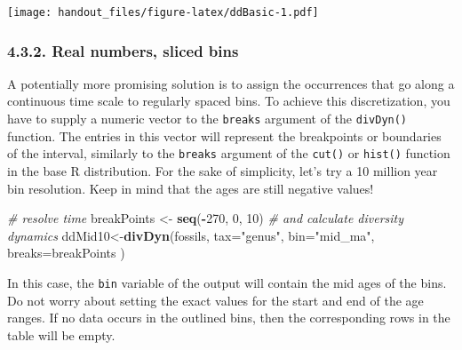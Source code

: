 \documentclass[]{article}
\newenvironment{Shaded}{\begin{snugshade}}{\end{snugshade}}
\newcommand{\CommentTok}[1]{\textcolor[rgb]{0.56,0.35,0.01}{\textit{#1}}}
\newcommand{\DataTypeTok}[1]{\textcolor[rgb]{0.13,0.29,0.53}{#1}}
\newcommand{\DecValTok}[1]{\textcolor[rgb]{0.00,0.00,0.81}{#1}}
\newcommand{\KeywordTok}[1]{\textcolor[rgb]{0.13,0.29,0.53}{\textbf{#1}}}
\newcommand{\NormalTok}[1]{#1}
\newcommand{\OperatorTok}[1]{\textcolor[rgb]{0.81,0.36,0.00}{\textbf{#1}}}
\newcommand{\StringTok}[1]{\textcolor[rgb]{0.31,0.60,0.02}{#1}}
\begin{document}
\texttt{[image: handout\_files/figure-latex/ddBasic-1.pdf]}

\hypertarget{real-numbers-sliced-bins}{%
\subsubsection{4.3.2. Real numbers, sliced
bins}\label{real-numbers-sliced-bins}}

A potentially more promising solution is to assign the occurrences that
go along a continuous time scale to regularly spaced bins. To achieve
this discretization, you have to supply a numeric vector to the
\texttt{breaks} argument of the \texttt{divDyn()} function. The entries
in this vector will represent the breakpoints or boundaries of the
interval, similarly to the \texttt{breaks} argument of the
\texttt{cut()} or \texttt{hist()} function in the base R distribution.
For the sake of simplicity, let's try a 10 million year bin resolution.
Keep in mind that the ages are still negative values!

\begin{Shaded}
\begin{Highlighting}[]
\CommentTok{# resolve time}
\NormalTok{  breakPoints <-}\StringTok{ }\KeywordTok{seq}\NormalTok{(}\OperatorTok{-}\DecValTok{270}\NormalTok{, }\DecValTok{0}\NormalTok{, }\DecValTok{10}\NormalTok{)}
\CommentTok{# and calculate diversity dynamics}
\NormalTok{  ddMid10<-}\KeywordTok{divDyn}\NormalTok{(fossils, }\DataTypeTok{tax=}\StringTok{"genus"}\NormalTok{, }\DataTypeTok{bin=}\StringTok{"mid_ma"}\NormalTok{, }\DataTypeTok{breaks=}\NormalTok{breakPoints )}
\end{Highlighting}
\end{Shaded}

In this case, the \texttt{bin} variable of the output will contain the
mid ages of the bins. Do not worry about setting the exact values for
the start and end of the age ranges. If no data occurs in the outlined
bins, then the corresponding rows in the table will be empty.

\begin{Shaded}
\end{Shaded}
\end{document}
